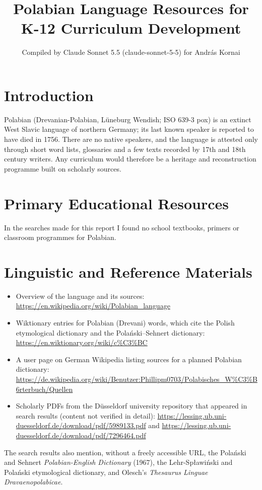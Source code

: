 \documentclass[12pt]{article}
\title{Polabian Language Resources for K-12 Curriculum Development}
\author{Compiled by Claude Sonnet 5.5 (claude-sonnet-5-5) for Andr\'as Kornai}
\date{}
\begin{document}
\maketitle

\section{Introduction}
Polabian (Drevanian-Polabian, Lüneburg Wendish; ISO 639-3 pox) is an extinct West Slavic language of northern Germany; its last known speaker is reported to have died in 1756. There are no native speakers, and the language is attested only through short word lists, glossaries and a few texts recorded by 17th and 18th century writers. Any curriculum would therefore be a heritage and reconstruction programme built on scholarly sources.

\section{Primary Educational Resources}
In the searches made for this report I found no school textbooks, primers or classroom programmes for Polabian.

\section{Linguistic and Reference Materials}
\begin{itemize}
\item Overview of the language and its sources: \url{https://en.wikipedia.org/wiki/Polabian_language}
\item Wiktionary entries for Polabian (Drevani) words, which cite the Polish etymological dictionary and the Polański--Sehnert dictionary: \url{https://en.wiktionary.org/wiki/c%C3%BC}
\item A user page on German Wikipedia listing sources for a planned Polabian dictionary: \url{https://de.wikipedia.org/wiki/Benutzer:Phillipm0703/Polabisches_W%C3%B6rterbuch/Quellen}
\item Scholarly PDFs from the Düsseldorf university repository that appeared in search results (content not verified in detail): \url{https://lessing.ub.uni-duesseldorf.de/download/pdf/5989133.pdf} and \url{https://lessing.ub.uni-duesseldorf.de/download/pdf/7296464.pdf}
\end{itemize}
The search results also mention, without a freely accessible URL, the Polański and Sehnert \emph{Polabian-English Dictionary} (1967), the Lehr-Spławiński and Polański etymological dictionary, and Olesch's \emph{Thesaurus Linguae Dravaenopolabicae}.
\end{document}

